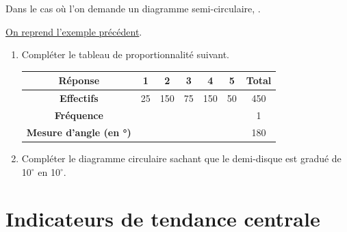 \documentclass[a4paper]{book}
\begin{document}
    \begin{remarque}
        Dans le cas où l'on demande un diagramme semi-circulaire, .

        \underline{On reprend l'exemple précédent}.

        \begin{enumerate}
            \item Compléter le tableau de proportionnalité suivant.

            \begin{center}
                \begin{tabular}{c|c|c|c|c|c|c}
                    \toprule
                    \textbf{Réponse} & \textbf{1} & \textbf{2} & \textbf{3} & \textbf{4} & \textbf{5} & \textbf{Total} \\
                    \midrule
                    \textbf{Effectifs} & 25 & 150 & 75 & 150 & 50 & 450 \\\hline
                    \textbf{Fréquence} &  &  & & \phantom{150} & \phantom{150} & 1 \\\hline
                    \textbf{Mesure d'angle (en °)} & \phantom{72} & \phantom{72} & \phantom{72} & \phantom{72} & \phantom{72} & 180 \\
                    \bottomrule
                \end{tabular}
            \end{center}

            \item Compléter le diagramme circulaire sachant que le demi-disque est gradué de 10$^\circ$ en 10$^\circ$.
    
            \begin{center}
            \end{center}
        \end{enumerate}
    \end{remarque}


\section{Indicateurs de tendance centrale}
\end{document}
